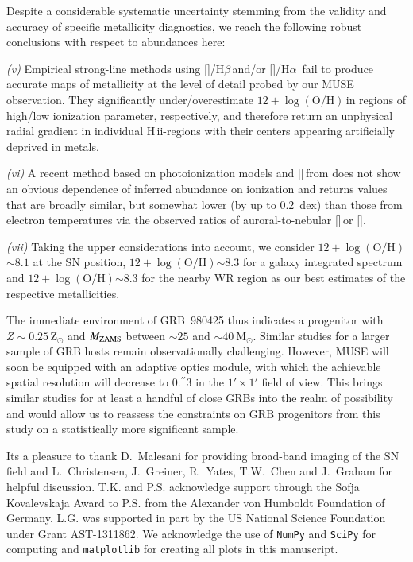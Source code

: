 \documentclass[traditabstract]{aa}
\newcommand{\farc}{\hbox{$.\!\!^{\prime\prime}$}}
\newcommand{\hb}{H$\beta$}
\newcommand{\ha}{H$\alpha$}
\newcommand{\hii}{\mbox{H\,{\sc ii}}}
\newcommand{\oh}{$12+\log(\mathrm{O/H})$}
\newcommand{\sii}{[\ion{S}{ii}]}
\newcommand{\siii}{[\ion{S}{iii}]}
\newcommand{\oiii}{[\ion{O}{iii}]}
\newcommand{\nii}{[\ion{N}{ii}]}
\begin{document}
Despite a considerable systematic uncertainty stemming from the validity and accuracy of specific metallicity diagnostics, we reach the following robust conclusions with respect to abundances here: 

\textit{(v)} Empirical strong-line methods using \oiii/\hb\,and/or \nii/\ha\, fail to produce accurate maps of metallicity at the level of detail probed by our MUSE observation. They significantly under/overestimate \oh\,in regions of high/low ionization parameter, respectively, and therefore return an unphysical radial gradient in individual \hii-regions with their centers appearing artificially deprived in metals.

\textit{(vi)} A recent method based on photoionization models and \sii\,from \citet{2016Ap&SS.361...61D} does not show an obvious dependence of inferred abundance on ionization and returns values that are broadly similar, but somewhat lower (by up to 0.2~dex) than those from electron temperatures via the observed ratios of auroral-to-nebular \siii\,or \oiii. 

\textit{(vii)} Taking the upper considerations into account, we consider \oh$\sim8.1$ at the SN position, \oh$\sim8.3$ for a galaxy integrated spectrum and \oh$\sim8.3$ for the nearby WR region as our best estimates of the respective metallicities. 

The immediate environment of GRB~980425 thus indicates a progenitor with $Z\sim0.25\,\mathrm{Z}_\odot$ and $M_{\rm{ZAMS}}$ between $\sim 25$ and $\sim40~\mathrm{M}_{\odot}$. Similar studies for a larger sample of GRB hosts remain observationally challenging. However, MUSE will soon be equipped with an adaptive optics module, with which the achievable spatial resolution will decrease to 0\farc{3} in the $1'\times1'$ field of view. This brings similar studies for at least a handful of close GRBs into the realm of possibility and would allow us to reassess the constraints on GRB progenitors from this study on a statistically more significant sample.


\begin{acknowledgements}

Its a pleasure to thank D.~Malesani for providing broad-band imaging of the SN field and L.~Christensen, J.~Greiner, R.~Yates, T.W.~Chen and J.~Graham for helpful discussion. T.K. and P.S. acknowledge support through the Sofja Kovalevskaja Award to P.S. from the Alexander von Humboldt Foundation of Germany. L.G. was supported in part by the US National Science Foundation under Grant AST-1311862. We acknowledge the use of \texttt{NumPy} and \texttt{SciPy} \citep{Walt:2011:NAS:1957373.1957466} for computing and \texttt{matplotlib} \citep{Hunter:2007} for creating all plots in this manuscript. 

\end{acknowledgements}
\end{document}
